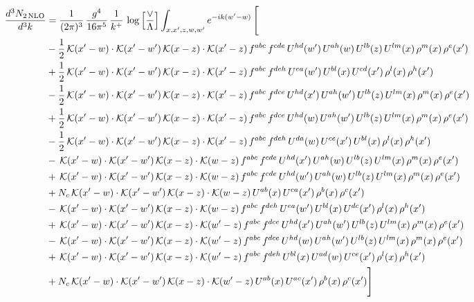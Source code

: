 \documentclass[9pt]{article}
\numberwithin{equation}{section}
\begin{document}
\begin{align}
\frac{d^{3}N_{2\,\mathrm{NLO}}}{d^{3}k} & = \frac{1}{(2\pi)^{3}}\,\frac{g^{4}}{16\pi^{5}}\,\frac{1}{k^{+}}\,\log\Big[\frac{\vee}{\Lambda}\Big]\int_{x,x',z,w,w'}e^{-ik(w'-w)}\,\Bigg[\notag\\ & -\frac{1}{2}\,\mathcal{K}(x'-w)\cdot\mathcal{K}(x'-w')\,\mathcal{K}(x-z)\cdot\mathcal{K}(x'-z)\,f^{abc}\,f^{cde}\,U^{hd}(w')\,U^{ah}(w)\,U^{lb}(z)\,U^{lm}(x)\,\rho^{m}(x)\,\rho^{e}(x')\notag\\
& +\frac{1}{2}\,\mathcal{K}(x'-w)\cdot\mathcal{K}(x'-w')\,\mathcal{K}(x-z)\cdot\mathcal{K}(x'-z)\,f^{abc}\,f^{deh}\,U^{ea}(w')\,U^{bl}(x)\,U^{cd}(x')\,\rho^{l}(x)\,\rho^{h}(x')\notag\\
& -\frac{1}{2}\,\mathcal{K}(x'-w)\cdot\mathcal{K}(x'-w')\,\mathcal{K}(x-z)\cdot\mathcal{K}(x'-z)\,f^{abc}\,f^{dce}\,U^{hd}(x')\,U^{ah}(w')\,U^{lb}(z)\,U^{lm}(x)\,\rho^{m}(x)\,\rho^{e}(x')\notag\\
& +\frac{1}{2}\,\mathcal{K}(x'-w)\cdot\mathcal{K}(x'-w')\,\mathcal{K}(x-z)\cdot\mathcal{K}(x'-z)\,f^{abc}\,f^{dce}\,U^{hd}(w)\,U^{ah}(w')\,U^{lb}(z)\,U^{lm}(x)\,\rho^{m}(x)\,\rho^{e}(x')\notag\\
& -\frac{1}{2}\,\mathcal{K}(x'-w)\cdot\mathcal{K}(x'-w')\,\mathcal{K}(x-z)\cdot\mathcal{K}(x'-z)\,f^{abc}\,f^{deh}\,U^{da}(w)\,U^{ce}(x')\,U^{bl}(x)\,\rho^{l}(x)\,\rho^{h}(x')\notag\\
& -\,\mathcal{K}(x'-w)\cdot\mathcal{K}(x'-w')\,\mathcal{K}(x-z)\cdot\mathcal{K}(w-z)\,f^{abc}\,f^{cde}\,U^{hd}(x')\,U^{ah}(w)\,U^{lb}(z)\,U^{lm}(x)\,\rho^{m}(x)\,\rho^{e}(x') \notag \\ &  +\,\mathcal{K}(x'-w)\cdot\mathcal{K}(x'-w')\,\mathcal{K}(x-z)\cdot\mathcal{K}(w-z)\,f^{abc}\,f^{cde}\,U^{hd}(w')\,U^{ah}(w)\,U^{lb}(z)\,U^{lm}(x)\,\rho^{m}(x)\,\rho^{e}(x')\notag\\
& +N_{c}\,\mathcal{K}(x'-w)\cdot\mathcal{K}(x'-w')\,\mathcal{K}(x-z)\cdot\mathcal{K}(w-z)\,U^{ab}(x)\,U^{ca}(x')\,\rho^{b}(x)\,\rho^{c}(x')\notag\\
& -\,\mathcal{K}(x'-w)\cdot\mathcal{K}(x'-w')\,\mathcal{K}(x-z)\cdot\mathcal{K}(w-z)\,f^{abc}\,f^{deh}\,U^{ea}(w')\,U^{bl}(x)\,U^{dc}(x')\,\rho^{l}(x)\,\rho^{h}(x')\notag\\
& +\,\mathcal{K}(x'-w)\cdot\mathcal{K}(x'-w')\,\mathcal{K}(x-z)\cdot\mathcal{K}(w'-z)\,f^{abc}\,f^{dce}\,U^{hd}(x')\,U^{ah}(w')\,U^{lb}(z)\,U^{lm}(x)\,\rho^{m}(x)\,\rho^{e}(x')\notag\\
& -\,\mathcal{K}(x'-w)\cdot\mathcal{K}(x'-w')\,\mathcal{K}(x-z)\cdot\mathcal{K}(w'-z)\,f^{abc}\,f^{dce}\,U^{hd}(w)\,U^{ah}(w')\,U^{lb}(z)\,U^{lm}(x)\,\rho^{m}(x)\,\rho^{e}(x')\notag\\
& +\,\mathcal{K}(x'-w)\cdot\mathcal{K}(x'-w')\,\mathcal{K}(x-z)\cdot\mathcal{K}(w'-z)\,f^{abc}\,f^{deh}\,U^{bl}(x)\,U^{ad}(w)\,U^{ce}(x')\,\rho^{l}(x)\,\rho^{h}(x')\notag\\
& +N_{c}\,\mathcal{K}(x'-w)\cdot\mathcal{K}(x'-w')\,\mathcal{K}(x-z)\cdot\mathcal{K}(w'-z)\,U^{ab}(x)\,U^{ac}(x')\,\rho^{b}(x)\,\rho^{c}(x')\Bigg]
\end{align}
\end{document}
